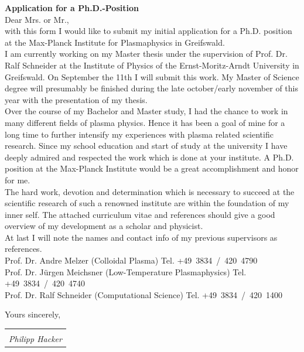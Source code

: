 \documentclass[11pt,a4paper]{moderncv}
\makeatletter
\newcommand{\sign}[1]{%
  \begin{tabular}[t]{@{}l@{}}
  \makebox[1.5in]{\dotfill}\\
  \strut\emph{#1}\strut%
  \end{tabular}%
}
\makeatother
\begin{document}
	\vspace*{1.0cm}
	{\bfseries \color{familynamecolor}%
		Application for a Ph.D.-Position
	}\\[0.75cm]
%
	Dear Mrs. or Mr.,\\[0.5cm]
%	
		with this form I would like to submit my initial application for a Ph.D. position at the Max-Planck Institute for Plasmaphysics in Greifswald.\\[0.3cm]
%
		I am currently working on my Master thesis under the supervision of Prof. Dr. Ralf Schneider at the Institute of Physics of the Ernst-Moritz-Arndt University in Greifswald. On September the 11th I will submit this work. My Master of Science degree will presumably be finished during the late october/early november of this year with the presentation of my thesis.\\[0.3cm] 
%
		Over the course of my Bachelor and Master study, I had the chance to work in many different fields of plasma physics. Hence it has been a goal of mine for a long time to further intensify my experiences with plasma related scientific research. Since my school education and start of study at the university I have deeply admired and respected the work which is done at your institute. A Ph.D. position at the Max-Planck Institute would be a great accomplishment and honor for me.\\[0.3cm]
%
		The hard work, devotion and determination which is necessary to succeed at the scientific research of such a renowned institute are within the foundation of my inner self. The attached curriculum vitae and references should give a good overview of my development as a scholar and physicist.\\[0.3cm]
%
		At last I will note the names and contact info of my previous supervisors as references.\\[0.3cm]
		\hspace*{0.5cm}Prof. Dr. Andre Melzer (Colloidal Plasma)%
			\hfill Tel. +49~3834~/~420~4790\\
		\hspace*{0.5cm}Prof. Dr. Jürgen Meichsner (Low-Temperature Plasmaphysics)%
			\hfill Tel. +49~3834~/~420~4740\\
		\hspace*{0.5cm}Prof. Dr. Ralf Schneider (Computational Science)%
			\hfill Tel. +49~3834~/~420~1400\\
%
	\vspace*{0.3cm}
	\begin{flushleft}
		Yours sincerely,\\[0.75cm]
		\sign{Philipp Hacker}\\[0.0cm]
	\end{flushleft}
%
	\newpage
	\pagestyle{fancy}
\end{document}
